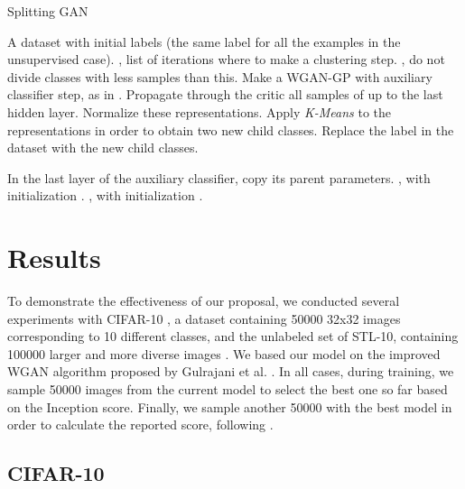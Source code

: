 \documentclass[times,twocolumn]{article}
\begin{document}
\begin{algorithm}
	\caption{Splitting GAN}
	\label{alg:splitting}
	\begin{algorithmic}
	\REQUIRE A dataset with initial labels (the same label for all the examples in the unsupervised case).
	\REQUIRE , list of iterations where to make a clustering step.
	\REQUIRE , do not divide classes with less samples than this.
    	\STATE Make a WGAN-GP with auxiliary classifier step, as in \cite{Gulrajani2017}.
          	\STATE Propagate through the critic all samples of  up to the last hidden layer.
          	\STATE Normalize these representations.
          	\STATE Apply \emph{K-Means} to the representations in order to obtain two new child classes.
          	\STATE Replace the label  in the dataset with the new child classes.
      	\ENDFOR
     	 
          	\STATE In the last layer of the auxiliary classifier, copy its parent parameters.
             	\STATE , with initialization .
             	\STATE , with initialization .
          	\ENDFOR
      	\ENDFOR
    	\ENDIF
    \ENDWHILE
	\end{algorithmic}
\end{algorithm}

\section{Results}\label{sec:results}
To demonstrate the effectiveness of our proposal, we conducted several experiments with CIFAR-10 \cite{Krizhevsky2009}, a dataset containing 50000 32x32 images corresponding to 10 different classes, and the unlabeled set of STL-10, containing 100000 larger and more diverse images \cite{Coates2011}. We based our model on the improved WGAN algorithm proposed by Gulrajani et al. \cite{Gulrajani2017,Gulrajani2017github}. In all cases, during training, we sample 50000 images from the current model to select the best one so far based on the Inception score. Finally, we sample another 50000 with the best model in order to calculate the reported score, following \cite{Odena2017}.

\subsection{CIFAR-10}
\end{document}
